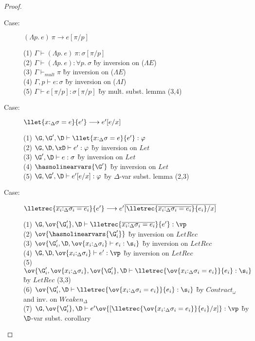 \begin{proof}
\begin{description}
\item[Case:] $(\Lambda p.~e)~\pi \longrightarrow e[\pi/p]$
\begin{tabbing}
(1) $\Gamma \vdash (\Lambda p.~e)~\pi : \sigma[\pi/p]$\\
(2) $\Gamma \vdash (\Lambda p.~e) : \forall p.~\sigma$ \` by inversion on ($\Lambda E$) \\
(3) $\Gamma \vdash_{mult} \pi$ \` by inversion on ($\Lambda E$) \\
(4) $\Gamma, p \vdash e : \sigma$ \` by inversion on ($\Lambda I$) \\
(5) $\Gamma \vdash e[\pi/p]:\sigma[\pi/p]$ \` by mult. subst. lemma (3,4) \\
\end{tabbing}

\item[Case:] $\llet{x{:}_\Delta\sigma = e}{e'}\longrightarrow e'[e/x]$
\begin{tabbing}
(1) $\G, \G', \D\vdash \llet{x{:}_\Delta\sigma = e}{e'} : \varphi$\\
(2) $\G, \D, \xD \vdash e' : \varphi$ \` by inversion on $Let$ \\
(3) $\G', \D \vdash e : \sigma$ \` by inversion on $Let$\\
(4) $\hasnolinearvars{\G'}$ \` by inversion on $Let$\\
(5) $\G, \G', \D \vdash e'[e/x] : \varphi$ \` by $\Delta$-var subst. lemma (2,3)\\
\end{tabbing}

\item[Case:] $\lletrec{\overline{x_i{:}_\Delta\sigma_i = e_i}}{e'}
    \longrightarrow e'\overline{[\lletrec{\overline{x_i{:}_\Delta\sigma_i = e_i}}{e_i}/x]}$
\begin{tabbing}
    (1) $\G, \ov{\G'_i}, \D \vdash \lletrec{\overline{x_i{:}_\Delta\sigma_i = e_i}}{e'} : \vp$\\
    (2) $\ov{\hasnolinearvars{\G'_i}}$ \` by inversion on $LetRec$\\
    (3) $\ov{\G'_i,\D, \ov{x_i{:}_\Delta\sigma_i} \vdash e_i : \s_i}$ \` by inversion on $LetRec$\\
    (4) $\G, \D, \ov{x_i{:}_\Delta\sigma_i} \vdash e' : \vp$ \` by inversion on $LetRec$\\
    (5) $\ov{\G'_i, \ov{x_i{:}_\Delta\sigma_i}, \ov{\G'_i}, \D \vdash \lletrec{\ov{x_i{:}_\Delta\sigma_i = e_i}}{e_i} : \s_i}$ \` by $LetRec$ (3,3)\\
    (6) $\ov{\G'_i, \D \vdash \lletrec{\ov{x_i{:}_\Delta\sigma_i = e_i}}{e_i} : \s_i}$ \` by $Contract_\omega$ and inv. on $Weaken_\Delta$\\
    (7) $\G, \ov{\G'_i}, \D \vdash e'\ov{[\lletrec{\ov{x_i{:}_\Delta\sigma_i = e_i}}{e_i}/x]} :
    \vp$ \` by $\D$-var subst. corollary\\
\end{tabbing}


\end{description}
\end{proof}
